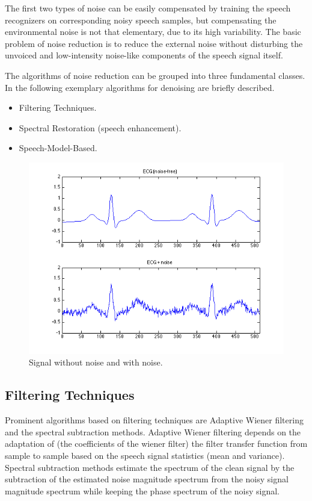 \documentclass[12pt, a4paper, twoside]{report}
\begin{document}
The first two types of noise can be easily compensated by training the speech recognizers on corresponding noisy speech samples, but compensating the environmental noise is not that elementary, due to its high variability. The basic problem of noise reduction is to reduce the external noise without disturbing the unvoiced and low-intensity noise-like components of the speech signal itself.
\par
The algorithms of noise reduction can be grouped into three fundamental classes. In the following exemplary algorithms for denoising are briefly described.
\begin{itemize}
\item Filtering Techniques.
\item Spectral Restoration (speech enhancement).
\item Speech-Model-Based.
\end{itemize}

\begin{figure}[!ht]
	\centering
	\includegraphics[width=1\textwidth]
	{images/chapter2/signal-noise}
	\caption{Signal without noise and with noise.}
	\label{fig:signal-noise}
\end{figure}

\subsection{Filtering Techniques}
Prominent algorithms based on filtering techniques are Adaptive Wiener filtering and the spectral subtraction methods. Adaptive Wiener filtering depends on the adaptation of (the coefficients of the wiener filter) the filter transfer function from sample to sample based on the speech signal statistics (mean and variance). Spectral subtraction methods estimate the spectrum of the clean signal by the subtraction of the estimated noise magnitude spectrum from the noisy signal magnitude spectrum while keeping the phase spectrum of the noisy signal.
\end{document}
